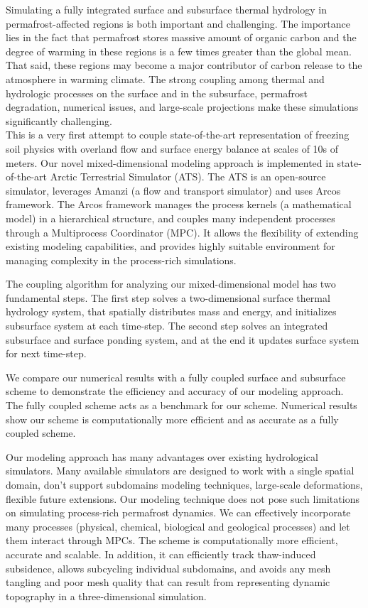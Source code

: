 \documentclass[review]{elsarticle}
\begin{document}
Simulating a fully integrated surface and subsurface thermal hydrology in permafrost-affected regions is both important and challenging. The importance lies in the fact that permafrost stores massive amount of organic carbon and the degree of warming in these regions is a few times greater than the global mean. That said, these regions may become a major contributor of carbon release to the atmosphere in warming climate. The strong coupling among thermal and hydrologic processes on the surface and in the subsurface, permafrost degradation, numerical issues, and large-scale projections make these simulations significantly challenging. \\
This is a very first attempt to couple state-of-the-art representation of freezing soil physics with overland flow and surface energy balance at scales of 10s of meters.  Our novel mixed-dimensional modeling approach is implemented in state-of-the-art Arctic Terrestrial Simulator (ATS). The ATS is an open-source simulator, leverages Amanzi (a flow and transport simulator) and uses Arcos framework. The Arcos framework manages the process kernels (a mathematical model) in a hierarchical structure, and couples many independent processes through a Multiprocess Coordinator (MPC). It allows the flexibility of extending existing modeling capabilities, and provides highly suitable environment for managing complexity in the process-rich simulations.

The coupling algorithm for analyzing our mixed-dimensional model has two fundamental steps. The first step solves a two-dimensional surface thermal hydrology system, that spatially distributes mass and energy, and initializes subsurface system at each time-step. The second step solves an integrated subsurface and surface ponding system, and at the end it updates surface system for next time-step.

We compare our numerical results with a fully coupled surface and subsurface scheme to demonstrate the efficiency and accuracy of our modeling approach. The fully coupled scheme acts as a benchmark for our scheme. Numerical results show our scheme is computationally more efficient and as accurate as a fully coupled scheme. 

Our modeling approach has many advantages over existing hydrological simulators. Many available simulators are designed to work with a single spatial domain, don't support subdomains modeling techniques, large-scale deformations, flexible future extensions. Our modeling technique does not pose such limitations on simulating process-rich permafrost dynamics. We can effectively incorporate many processes (physical, chemical, biological and geological processes) and let them interact through MPCs. The scheme is computationally more efficient, accurate and scalable. In addition, it can efficiently track thaw-induced subsidence, allows subcycling individual subdomains, and avoids any mesh tangling and poor mesh quality that can result from representing dynamic topography in a three-dimensional simulation.
 
\end{document}
